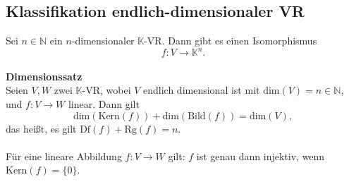\documentclass[a4paper,12pt]{article}
\numberwithin{equation}{section}
\begin{document}
\subsection{Klassifikation endlich-dimensionaler VR}
Sei $n  \in  \mathbb{N}$ ein $n$-dimensionaler $\mathbb{K}$-VR. Dann gibt es einen Isomorphismus
\[ 
        f:V\rightarrow \mathbb{K}^{n}
.\] 
\hfill\\\textbf{Dimensionssatz}\\ 
Seien $V,W$ zwei $\mathbb{K}$-VR, wobei $V$ endlich dimensional ist mit $\text{dim}\left(V\right)=n  \in \mathbb{N}$, und $f:V\rightarrow W$ linear. Dann gilt
\[ 
        \text{dim}\left(\text{Kern}\left(f\right)\right)+\text{dim}\left(\text{Bild}\left(f\right)\right)=\text{dim}\left(V\right)
,\] 
das heißt, es gilt $\text{Df}\left(f\right)+\text{Rg}\left(f\right)=n$.\\\\
Für eine lineare Abbildung $f:V\rightarrow W$ gilt: $f$ ist genau dann injektiv, wenn $\text{Kern}\left(f\right)=\{0\}$.
\end{document}
